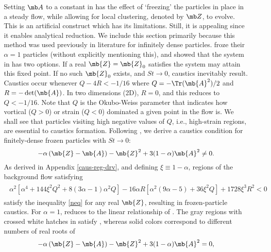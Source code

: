 Setting $\mb A$ to a constant in  has the effect of `freezing' the particles in place in a steady flow, while allowing for local clustering, denoted by $\mb Z$, to evolve. {This is an artificial construct which has its limitations. Still, it is appealing since it enables analytical reduction. We include this section primarily because this method was used previously in literature \cite{meibohm2021,meibohm2023,meibohm2024} for infinitely dense particles.} \citet{meibohm2021,meibohm2023} froze their $\alpha=1$ particles (without explicitly mentioning this), and showed that the system in  has two options. If a real $\mb{Z}=\mb{Z}_0$ satisfies  the system may attain this fixed point. If no such $\mb{Z}_0$  exists, and $St \to 0$, caustics inevitably result. Caustics occur whenever $Q - 4R < -1/16$ where $Q = -\Tr(\mb{A}^2)/2$ and $R = -\det(\mb{A})$. In two dimensions (2D), $R=0$, and this reduces to $Q < -1/16$. Note that $Q$ is the Okubo-Weiss parameter that indicates how vortical ($Q>0$) or strain ($Q<0$) dominated a given point in the flow is. We shall see that particles visiting high negative values of $Q$, i.e., high-strain regions, are essential to caustics formation. Following \cite{meibohm2021}, we derive a caustics condition for finitely-dense frozen particles with $St \to 0$:
\begin{align}
\label{neq}
\begin{split}
  -\alpha\left( \mb{Z}- \mb{A} \right) -\mb{Z}^2  + 3(1 - \alpha) \mb{A}^2 \neq 0.
\end{split}
\end{align}
As derived in Appendix \ref{caus-reg-drv}, and defining $\xi \equiv 1-\alpha$, regions of the background flow satisfying 
\begin{align}
\label{caus_cond}
\begin{split}
  \alpha ^2 \left[\alpha ^4+144 \xi^2 Q^2+8 (3 \alpha -1) \alpha ^2 Q\right]-16 \alpha  R \left[\alpha ^2 (9 \alpha -5)+36 \xi^2 Q\right]
     + 1728 \xi^3 R^2 < 0
\end{split}
\end{align}
satisfy the inequality \eqref{neq} for any real $\mb{Z}$, resulting in frozen-particle caustics. For $\alpha = 1$,  reduces to the linear relationship of \cite{meibohm2023}. 
The gray regions with crossed white hatches in  satisfy , whereas solid colors correspond to different numbers of real roots of
\begin{align}
  \label{root-eq}
\begin{split}
    -\alpha\left( \mb{Z}- \mb{A} \right) -\mb{Z}^2  + 3(1 - \alpha) \mb{A}^2 = 0,
\end{split}
\end{align}
